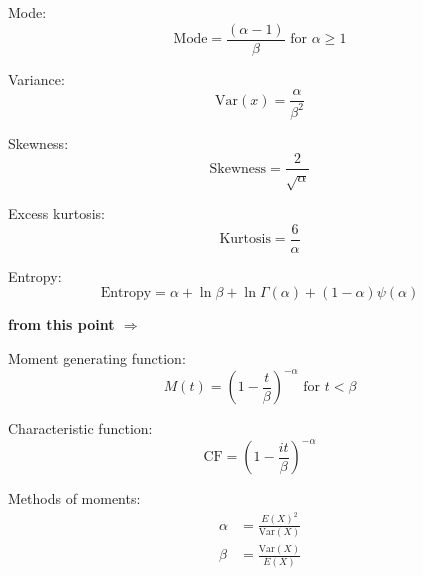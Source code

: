 \documentclass[12pt]{article}
\begin{document}
Mode:
\begin{equation}\label{eq:gamma-mode-2}
	\text{Mode} = \frac{(\alpha-1)}{\beta}\text{ for }\alpha \geq 1
\end{equation}

Variance:
\begin{equation}\label{eq:gamma-variance-2}
	\text{Var}(x) = \frac{\alpha}{\beta^2}
\end{equation}

Skewness:
\begin{equation}\label{eq:gamma-skewness-2}
	\text{Skewness} = \frac{2}{\sqrt{\alpha}}
\end{equation}

Excess kurtosis:
\begin{equation}\label{eq:gamma-kurtosis-2}
	\text{Kurtosis} = \frac{6}{\alpha}
\end{equation}

Entropy:
\begin{equation}\label{eq:gamma-entropy-2}
	\text{Entropy} = \alpha + \ln{\beta} + \ln{\Gamma(\alpha)} + (1-\alpha)\psi(\alpha)
\end{equation}

\incomplete\textbf{ from this point $\Rightarrow$}

Moment generating function:
\begin{equation}\label{eq:gamma-mgf-2}
	M(t) = \left(1-\frac{t}{\beta}\right)^{-\alpha}\text{ for }t < \beta
\end{equation}

Characteristic function:
\begin{equation}\label{eq:gamma-cf-2}
	\text{CF} = \left(1-\frac{it}{\beta}\right)^{-\alpha}
\end{equation}

Methods of moments:
\begin{equation}\label{eq:gamma-mom-2}
	\begin{split}
		\alpha	&=	\frac{E(X)^2}{\text{Var}(X)}\\
		\beta	&=	\frac{\text{Var}(X)}{E(X)}
	\end{split}
\end{equation}

\pagebreak

\begin{appendix}
	\listoffigures
	\listoftables
\end{appendix}

\pagebreak{}\printbibliography[heading=bibintoc,title={References}]
\end{document}
